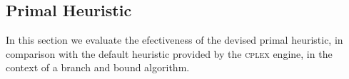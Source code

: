 
\subsection{Primal Heuristic}
\label{subsec:resultsprimal}

In this section we evaluate the efectiveness of the devised primal heuristic, in comparison with the default heuristic provided by the \textsc{cplex} engine, in the context of a branch and bound algorithm. 

